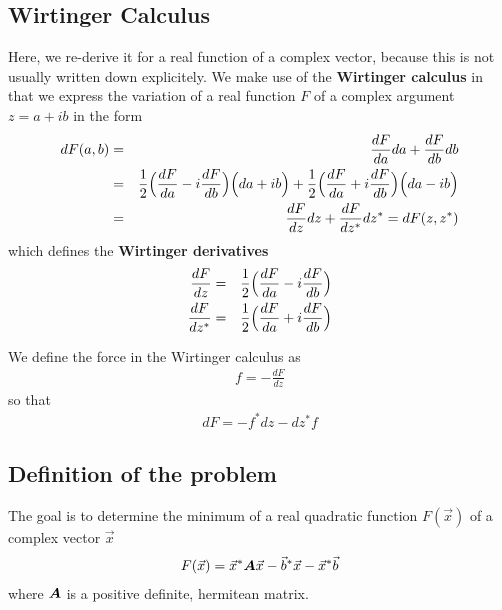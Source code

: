 \documentclass[11pt,a4paper]{report}
\begin{document}
\subsection{Wirtinger Calculus}
Here, we re-derive it for a real function of a complex vector, because
this is not usually written down explicitely.  We make use of the
\textbf{Wirtinger calculus} in that we
express the variation of a real function $F$ of a complex argument $z=a+ib$
in the form
\begin{eqnarray}
dF(a,b)&=&\frac{dF}{da}da+\frac{dF}{db}db
\nonumber\\
&=&\frac{1}{2}\Bigl(\frac{dF}{da}-i\frac{dF}{db}\Bigr)\Bigl(da+ib\Bigr)
+\frac{1}{2}\Bigl(\frac{dF}{da}+i\frac{dF}{db}\Bigr)\Bigl(da-ib\Bigr)
\nonumber\\
&=&\frac{dF}{dz}dz+ \frac{dF}{dz^*}dz^*=dF(z,z^*)
\end{eqnarray}
which defines the \textbf{Wirtinger derivatives}
\begin{eqnarray}
\frac{dF}{dz}&=&\frac{1}{2}\Bigl(\frac{dF}{da}-i\frac{dF}{db}\Bigr)
\nonumber\\
\frac{dF}{dz^*}&=&\frac{1}{2}\Bigl(\frac{dF}{da}+i\frac{dF}{db}\Bigr)
\end{eqnarray}


We define the force in the Wirtinger calculus as
\begin{eqnarray}
f=-\frac{dF}{dz}
\end{eqnarray}
so that
\begin{eqnarray}
dF=-f^*dz-dz^*f
\end{eqnarray}


\subsection{Definition of the problem}
The goal is to determine the minimum of a real quadratic function
$F(\vec{x})$ of a complex vector $\vec{x}$
\begin{eqnarray}
F(\vec{x})=\vec{x}^*\bm{A}\vec{x}-\vec{b}^*\vec{x}-\vec{x}^*\vec{b}
\end{eqnarray}
where $\bm{A}$ is a positive definite, hermitean matrix.
\end{document}
